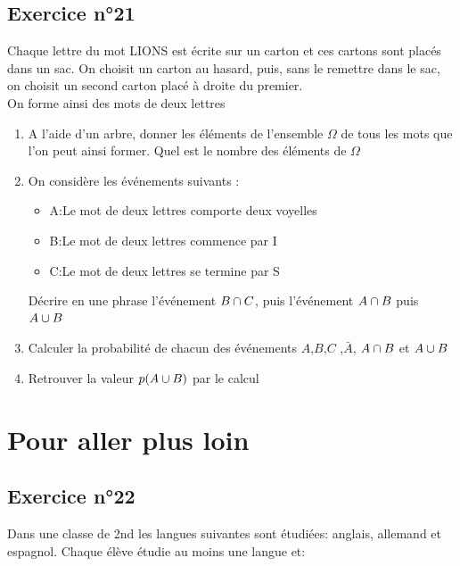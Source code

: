\documentclass[12pt,a4paper]{article}
\begin{document}
\subsection*{Exercice n°21}

Chaque lettre du mot \og LIONS \fg est écrite sur un carton et ces cartons sont placés dans un sac. On choisit un carton au hasard, puis, sans le remettre dans le sac, on choisit un second carton placé à droite du premier.\\
On forme ainsi des \og mots \fg de deux lettres

\begin{enumerate}
    \item A l'aide d'un arbre, donner les éléments de l'ensemble $\Omega$ de tous les mots que l'on peut ainsi former. Quel est le nombre des éléments de $\Omega$
    \item On considère les événements suivants :
    \begin{itemize}
        \item A:\og Le mot de deux lettres comporte deux voyelles \fg
        \item B:\og Le mot de deux lettres commence par I \fg
        \item  C:\og Le mot de deux lettres se termine par S \fg
    \end{itemize}
    Décrire en une phrase l'événement $B\cap C$, puis l'événement $A\cap B$ puis $A\cup B$
    \item Calculer la probabilité de chacun des événements $A$,$B$,$C$ ,$\bar{A}$, $A\cap B$ et $A\cup B$
    \item Retrouver la valeur $p(A\cup B)$ par le calcul 
\end{enumerate}

\section{Pour aller plus loin}

\subsection*{Exercice n°22}

Dans une classe de 2nd les langues suivantes sont étudiées: anglais, allemand et espagnol.
Chaque élève étudie au moins une langue et:

\end{document}
